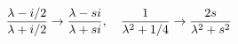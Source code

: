 \begin{equation}
{\lambda -i/2\over\lambda+i/2}\rightarrow {\lambda-si\over
  \lambda+si},~~~
{1\over\lambda^2+1/4}\rightarrow {2s\over\lambda^2+s^2} 
\end{equation}

